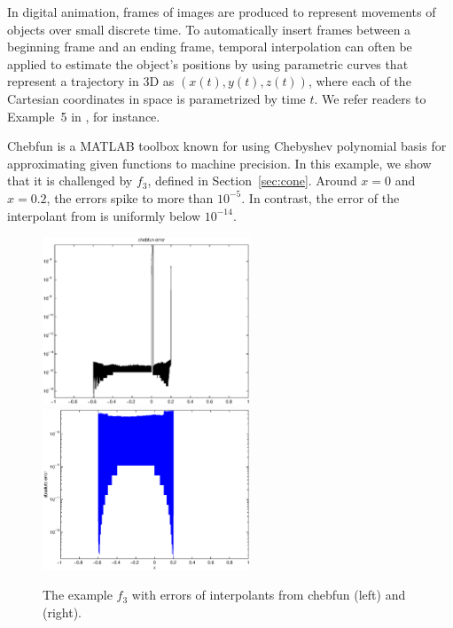 In digital animation, frames of images are produced to represent movements of
objects over small discrete time. To automatically insert frames between a
beginning frame and an ending frame, temporal interpolation can often be applied to estimate
the object's positions by using parametric curves that represent a trajectory in
3D as $(x(t), y(t), z(t))$, where each of the Cartesian coordinates in space is
parametrized by time $t$.  We refer readers to Example~5 in \cite{Din15a}, for instance.


\begin{exmp}
Chebfun is a MATLAB toolbox known for using Chebyshev polynomial basis for
approximating given functions to machine precision. In this example, we show
that it is challenged by $f_3$, defined in Section~\ref{sec:cone}. Around $x=0$
and $x=0.2$, the errors spike to more than $10^{-5}$. In contrast, the error of
the interpolant from \funappxg is uniformly below $10^{-14}$.

\begin{figure}[t]
\centering
\includegraphics[width=6.2cm]{figure/chebfunf3.eps} \hspace{-5ex}
\includegraphics[width=6.2cm]{figure/funappxNoPenaltyf3.eps}
\caption{The example $f_3$ with errors of interpolants from chebfun (left) and \funappxg (right).}
\label{f3fig}
\end{figure}
\end{exmp}

